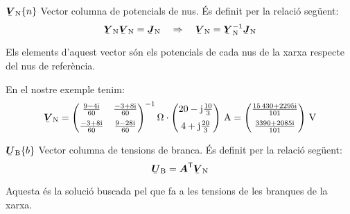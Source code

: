 \begin{list}{}
   \item[$\mcmplx{V}\ped{N}\{n\}$] Vector columna de potencials de nus. És definit per la relació següent:
   \begin{equation}
      \mcmplx{Y}\ped{N} \mcmplx{V}\ped{N} = \mcmplx{J}\ped{N} \quad\Rightarrow\quad
      \mcmplx{V}\ped{N} = \mcmplx{Y}\ped{N}^{-1} \mcmplx{J}\ped{N} \label{eq:vn}
   \end{equation}

   Els elements d'aquest vector són els potencials de cada nus de la xarxa respecte del nus de referència.

   En el nostre exemple tenim:
   \[
      \mcmplx{V}\ped{N} =
      \begin{pmatrix}
            \frac{\complexnum{ 9 - j 4}}{60} & \frac{\complexnum{-3 + j 8}}{60} \\[2mm]
            \frac{\complexnum{-3 + j 8}}{60} & \frac{\complexnum{9 - j 28}}{60}
      \end{pmatrix} ^{-1}\unit{\ohm} \cdot
      \begin{pmatrix}
            20 - \ju \frac{10}{3} \\[2mm]
            4 + \ju \frac{20}{3}
      \end{pmatrix}\,\unit{A}
      =
      \begin{pmatrix}
            \frac{\complexnum{15430 + j 2295}}{101} \\[2mm]
            \frac{\complexnum{3390 + j 2085}}{101}
      \end{pmatrix}\,\unit{V}
      \label{eq:vn_exemp}
   \]

   \item[$\mcmplx{U}\ped{B}\{b\}$] Vector columna de tensions de branca. És definit per la relació següent:
   \begin{equation}
      \mcmplx{U}\ped{B} = \transp{\boldsymbol{A}} \mcmplx{V}\ped{N} \label{eq:ur}
   \end{equation}

   Aquesta és la solució buscada pel que fa a les tensions de les branques de la xarxa.


\end{list}

